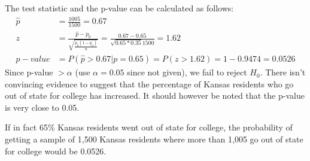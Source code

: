 {{The test statistic and the p-value can be calculated as follows:
\begin{align*}
\hat{p} &= \frac{1005}{1500} = 0.67 \\
z &= \frac{\hat{p} - p_0}{\sqrt{\frac{p_0 (1 - p_0)}{n}}} = \frac{0.67 - 0.65}{\sqrt{0.65 * 0.35}{1500}} = 1.62 \\
p-value &= P(\hat{p} > 0.67 | p = 0.65) = P(z > 1.62) = 1 - 0.9474 = 0.0526
\end{align*}
Since p-value $> \alpha$ (use $\alpha = 0.05$ since not given), we fail to reject $H_0$. There isn't convincing evidence to suggest that the percentage of Kansas residents who go out of state for college has increased. It should however be noted that the p-value is very close to 0.05.
}\label{Kansas}
}

%

{
{If in fact 65\% Kansas residents went out of state for college, the probability of getting a sample of 1,500 Kansas residents where more than 1,005 go out of state for college would be 0.0526.}
}

%

